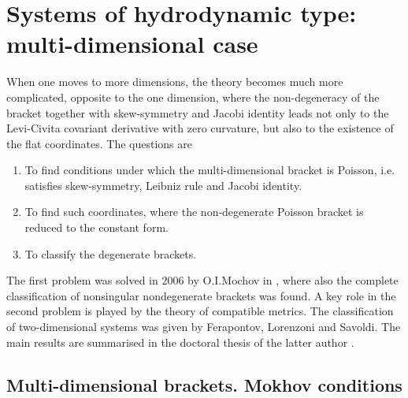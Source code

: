 \chapter{Systems of hydrodynamic type:  multi-dimensional case}

When one moves to more dimensions, the theory becomes much more complicated, opposite to the one dimension, where the non-degeneracy of the bracket together with skew-symmetry and Jacobi identity leads not only to the Levi-Civita covariant derivative with zero curvature, but also to the existence of the flat coordinates.
The questions are
\begin{enumerate}
    \item To find conditions under which the multi-dimensional bracket is Poisson, i.e. satisfies skew-symmetry, Leibniz rule and Jacobi identity.
    \item To find such coordinates, where the non-degenerate Poisson bracket is reduced to the constant form.
    \item To classify the degenerate brackets.
\end{enumerate}

The first problem was solved in 2006 by O.I.Mochov in \cite{Mochov}, where also the complete classification of nonsingular nondegenerate brackets was found. A key role in the second problem is played by the theory of compatible metrics. The classification of two-dimensional systems was given by Ferapontov, Lorenzoni and Savoldi. The main results are summarised in the doctoral thesis of the latter author \cite{Savoldi}.

\section{Multi-dimensional brackets. Mokhov conditions}

